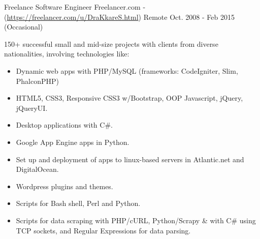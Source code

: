 \begin{cventries}

\cventry
{Freelance Software Engineer} %
{Freelancer.com - (\href{https://freelancer.com/u/DraKkareS.html}{https://freelancer.com/u/DraKkareS.html})} %
{Remote} %
{Oct. 2008 - Feb 2015 (Occasional)} %
{ %
	\begin{cvitems}
		\item {150+ successful small and mid-size projects with clients from diverse nationalities, involving technologies like:
		\begin{itemize}
			\item {Dynamic web apps with PHP/MySQL (frameworks: CodeIgniter, Slim, PhalconPHP)}
			\item {HTML5, CSS3, Responsive CSS3 w/Bootstrap, OOP Javascript, jQuery, jQueryUI.}
			\item {Desktop applications with C\#.}
			\item {Google App Engine apps in Python.}
			\item {Set up and deployment of apps to linux-based servers in Atlantic.net and DigitalOcean.}
			\item {Wordpress plugins and themes.}
			\item {Scripts for Bash shell, Perl and Python.}
			\item {Scripts for data scraping with PHP/cURL, Python/Scrapy \& with C\# using TCP sockets, and Regular Expressions for data parsing.}
		\end{itemize}	
	}	
	\end{cvitems}
}


\end{cventries}